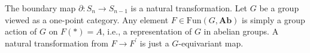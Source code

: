 \begin{example}
The boundary map $\partial:S_n\to S_{n-1}$ is a natural transformation. Let $G$ be a group viewed as a one-point category. Any element $F\in\mathrm{Fun}(G,\mathbf{Ab})$ is simply a group action of $G$ on $F(\ast)=A$, i.e., a representation of $G$ in abelian groups. A natural transformation from $F\to F^\prime$ is just a $G$-equivariant map.
\end{example}
